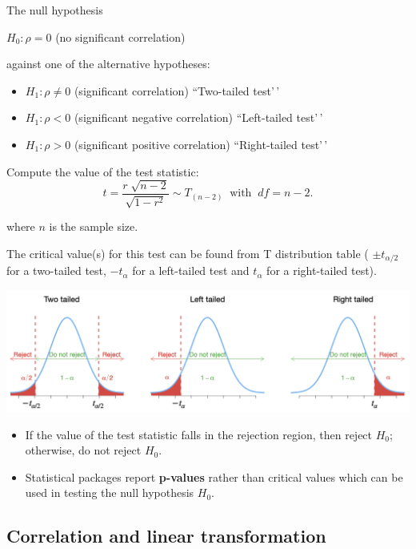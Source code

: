 \documentclass[
]{article}
\providecommand{\tightlist}{%
  \setlength{\itemsep}{0pt}\setlength{\parskip}{0pt}}
\begin{document}
The null hypothesis

\(H_0: \rho = 0\) (no significant correlation)

against one of the alternative hypotheses:

\begin{itemize}
\item
  \(H_1: \rho \neq 0\) (significant correlation) ``Two-tailed test'\,'
\item
  \(H_1: \rho < 0\) (significant negative correlation) ``Left-tailed
  test'\,'
\item
  \(H_1: \rho > 0\) (significant positive correlation) ``Right-tailed
  test'\,'
\end{itemize}

Compute the value of the test statistic:
\[t=\frac{r\; \sqrt{n-2} }{\sqrt{1-r^{2} } }\sim T_{(n-2)} \;\; \text{with}\;\; df = n-2. \]

where \(n\) is the sample size.

The critical value(s) for this test can be found from T distribution
table ( \(\pm t_{\alpha/2}\) for a two-tailed test, \(- t_{\alpha}\) for
a left-tailed test and \(t_{\alpha}\) for a right-tailed test).

\begin{center}\includegraphics[width=0.8\linewidth,height=0.8\textheight]{figures/hypottest} \end{center}

\begin{itemize}
\tightlist
\item
  If the value of the test statistic falls in the rejection region, then
  reject \(H_0\); otherwise, do not reject \(H_0\).
\item
  Statistical packages report \textbf{p-values} rather than critical
  values which can be used in testing the null hypothesis \(H_0\).
\end{itemize}

\hypertarget{correlation-and-linear-transformation}{%
\subsection{Correlation and linear
transformation}\label{correlation-and-linear-transformation}}
\end{document}
